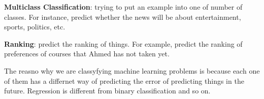 \documentclass{article}
\begin{document}
\vspace{0.5cm}

\textbf{Multiclass Classification}: trying to put an example into one of number of classes. For instance, predict whether the news will be about entertainment, sports, politics, etc.

\vspace{0.5cm}

\textbf{Ranking}: predict the ranking of things. For example, predict the ranking of preferences of courses that Ahmed has not taken yet.

\vspace{0.5cm}

The reasno why we are classyfying machine learning problems is because each one of them has a differnet way of predicting the error of predicting things in the future. Regression is different from binary classification and so on.
\end{document}
